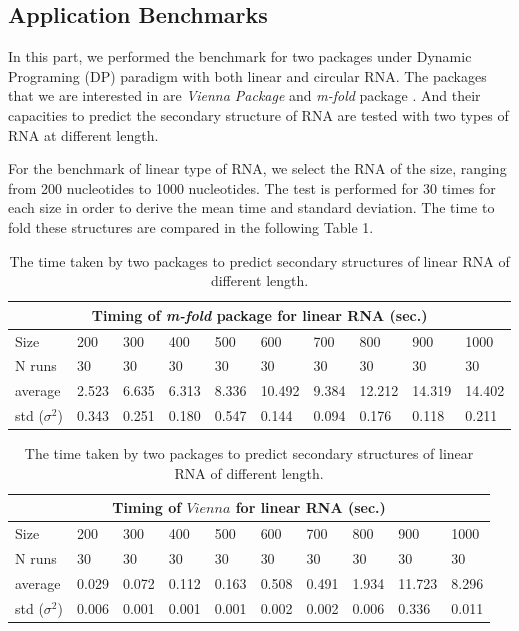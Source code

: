 \documentclass[12pt]{article}
\begin{document}
\subsection{Application Benchmarks}
In this part, we performed the benchmark for two packages under Dynamic Programing (DP) paradigm with both linear and circular RNA. The packages that we are interested in are \textit{Vienna Package} \cite{vienna} and \textit{m-fold} package \cite{zuker1989,zuker1981}. And their capacities to predict the secondary structure of RNA are tested with two types of RNA at different length.

For the benchmark of linear type of RNA, we select the RNA of the size, ranging from 200 nucleotides to 1000 nucleotides. The test is performed for 30 times for each size in order to derive the mean time and standard deviation. The time to fold these structures are compared in the following Table 1.
\begin{table}[h!]
    \begin{tabular}{ |p{1.5cm}||p{1.05cm}|p{1.05cm}|p{1.05cm}|p{1.05cm}|p{1.05cm}|p{1.05cm}|p{1.05cm}| p{1.05cm} | p{1.05cm} |}
    \hline
    \multicolumn{10}{|c|}{Timing of \textit{m-fold} package for linear RNA (sec.)} \\
    \hline
    Size& 200& 300& 400& 500& 600& 700 & 800 & 900 & 1000\\
    \hline
    N runs& 30 & 30& 30 & 30& 30& 30& 30& 30& 30\\
    \hline
    average& 2.523 & 6.635 & 6.313 & 8.336 & 10.492 & 9.384 & 12.212 & 14.319 & 14.402\\
    std ($\sigma^2$) &0.343 & 0.251 & 0.180 & 0.547 & 0.144 & 0.094 & 0.176 & 0.118 & 0.211 \\
    \hline
    \end{tabular}

    \begin{tabular}{ |p{1.5cm}||p{1.05cm}|p{1.05cm}|p{1.05cm}|p{1.05cm}|p{1.05cm}|p{1.05cm}|p{1.05cm}| p{1.05cm} | p{1.05cm} |}
    \hline
    \multicolumn{10}{|c|}{Timing of $Vienna$ for linear RNA (sec.)} \\
    \hline
    Size& 200& 300& 400& 500& 600& 700 & 800 & 900 & 1000\\
    \hline
    N runs& 30 & 30& 30 & 30& 30& 30& 30& 30& 30\\
    \hline
    average& 0.029 & 0.072 & 0.112 & 0.163 & 0.508 & 0.491 & 1.934 & 11.723 & 8.296\\
    std ($\sigma^2$) &0.006 & 0.001 & 0.001 & 0.001 & 0.002 & 0.002 & 0.006 & 0.336 & 0.011 \\
    \hline
    \end{tabular}
\caption{The time taken by two packages to predict secondary structures of linear RNA of different length.}
\end{table}
\end{document}

